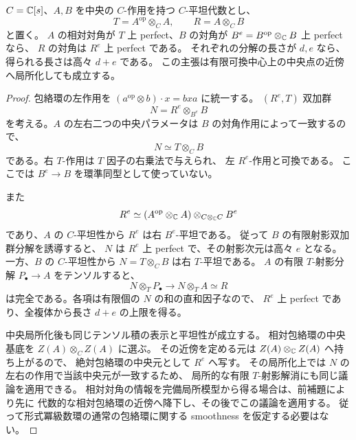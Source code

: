 \begin{lemma}
\label{cmo:lem:mixed-relative-diagonal}
$C=\mathbb C[s]$、$A,B$ を中央の $C$-作用を持つ $C$-平坦代数とし、
\[
 T=A^{\mathrm{op}}\otimes_C A,\qquad R=A\otimes_C B
\]
と置く。
$A$ の相対対角が $T$ 上 perfect、$B$ の対角が
$B^e=B^{\mathrm{op}}\otimes_\mathbb C B$ 上 perfect なら、
$R$ の対角は $R^e$ 上 perfect である。
それぞれの分解の長さが $d,e$ なら、得られる長さは高々 $d+e$ である。
この主張は有限可換中心上の中央点の近傍へ局所化しても成立する。
\end{lemma}

\begin{proof}
包絡環の左作用を
$(a^{\mathrm{op}}\otimes b)\cdot x=bxa$ に統一する。
$(R^e,T)$ 双加群
\[
 N=R^e\otimes_{B^e}B
\]
を考える。$A$ の左右二つの中央パラメータは $B$ の対角作用によって一致するので、
\[
 N\simeq T\otimes_C B
\]
である。右 $T$-作用は $T$ 因子の右乗法で与えられ、
左 $R^e$-作用と可換である。
ここでは $B^e\to B$ を環準同型として使っていない。

また
\[
 R^e\simeq(A^{\mathrm{op}}\otimes_\mathbb C A)
                 \otimes_{C\otimes_\mathbb C C}B^e
\]
であり、$A$ の $C$-平坦性から $R^e$ は右 $B^e$-平坦である。
従って $B$ の有限射影双加群分解を誘導すると、
$N$ は $R^e$ 上 perfect で、その射影次元は高々 $e$ となる。
一方、$B$ の $C$-平坦性から $N=T\otimes_C B$ は右 $T$-平坦である。
$A$ の有限 $T$-射影分解 $P_\bullet\to A$ をテンソルすると、
\[
 N\otimes_TP_\bullet\longrightarrow
 N\otimes_TA\simeq R
\]
は完全である。各項は有限個の $N$ の和の直和因子なので、
$R^e$ 上 perfect であり、全複体から長さ $d+e$ の上限を得る。

中央局所化後も同じテンソル積の表示と平坦性が成立する。
相対包絡環の中央基底を $Z(A)\otimes_C Z(A)$ に選ぶ。
その近傍を定める元は $Z(A)\otimes_\mathbb C Z(A)$ へ持ち上がるので、
絶対包絡環の中央元として $R^e$ へ写す。
その局所化上では $N$ の左右の作用で当該中央元が一致するため、
局所的な有限 $T$-射影解消にも同じ議論を適用できる。
相対対角の情報を完備局所模型から得る場合は、前補題により先に
代数的な相対包絡環の近傍へ降下し、その後でこの議論を適用する。
従って形式冪級数環の通常の包絡環に関する smoothness を仮定する必要はない。
\end{proof}

